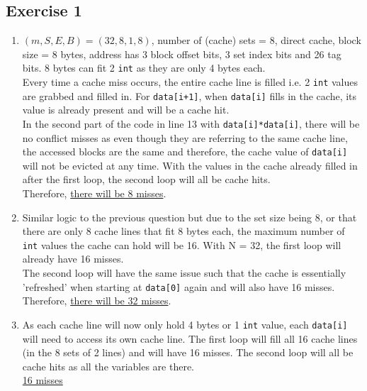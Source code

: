 \documentclass[11pt]{article}
\begin{document}
\subsection*{Exercise 1}
\begin{enumerate}[label=\alph*)]
    \item %
    $(m,S,E,B) = (32,8,1,8)$, number of (cache) sets = 8, direct cache, block size = 8 bytes, address has 3 block offset bits, 3 set index bits and 26 tag bits. 8 bytes can fit 2 \texttt{int} as they are only 4 bytes each.\\
    Every time a cache miss occurs, the entire cache line is filled i.e. 2 \texttt{int} values are grabbed and filled in. For \texttt{data[i+1]}, when \texttt{data[i]} fills in the cache, its value is already present and will be a cache hit.\\
    In the second part of the code in line 13 with \texttt{data[i]*data[i]}, there will be no conflict misses as even though they are referring to the same cache line, the accessed blocks are the same and therefore, the cache value of \texttt{data[i]} will not be evicted at any time. With the values in the cache already filled in after the first loop, the second loop will all be cache hits.\\
    Therefore, \underline{there will be 8 misses}.
    \item %
    Similar logic to the previous question but due to the set size being 8, or that there are only 8 cache lines that fit 8 bytes each, the maximum number of \texttt{int} values the cache can hold will be 16. With N = 32, the first loop will already have 16 misses.\\
    The second loop will have the same issue such that the cache is essentially 'refreshed' when starting at \texttt{data[0]} again and will also have 16 misses.\\
    Therefore, \underline{there will be 32 misses}.  
    \item %
    As each cache line will now only hold 4 bytes or 1 \texttt{int} value, each \texttt{data[i]} will need to access its own cache line. The first loop will fill all 16 cache lines (in the 8 sets of 2 lines) and will have 16 misses. The second loop will all be cache hits as all the variables are there.\\ 
    \underline{16 misses}
\end{enumerate}
\end{document}
